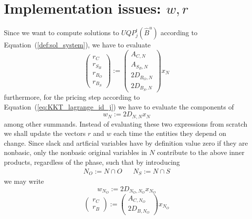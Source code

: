 \documentclass[a4paper]{article}
\begin{document}
\section{Implementation issues: $w,r$}
Since we want to compute solutions to $UQP_{j}^{t}(\hat{B}^{u})$
according to Equation~(\ref{def:sol_system}),
we have to evaluate 
\begin{equation}
\left(
\begin{array}{c}
r_{C} \\
\hline
r_{S_{B}} \\
\hline
r_{B_{O}} \\
\hline
r_{B_{S}}
\end{array}
\right)
:=
\left(
\begin{array}{c}
A_{C, N} \\
\hline
A_{S_{B}, N} \\
\hline
2D_{B_{O}, N} \\
\hline
2D_{B_{S}, N}
\end{array}
\right)
x_{N}
\end{equation}
furthermore, for the pricing step according to
Equation~(\ref{eq:KKT_lagrange_id_j}) we have to evaluate the components of
\begin{equation}
w_{N}:=2D_{N, N}x_{N}
\end{equation}
among other summands.
Instead of evaluating these two expressions from scratch we shall update
the vectors $r$ and $w$ each time the entities they depend on change.
Since slack and artficial variables have by definition
value zero if they are nonbasic,
only the nonbasic original variables in $N$ contribute to the above
inner products, regardless of the phase, such that by introducing
\begin{eqnarray}
N_{O}:=N \cap O && N_{S}:=N \cap S
\end{eqnarray} 
we may write
\begin{equation}
w_{N_{O}}:=2D_{N_{O} , N_{O}}x_{N_{O}}
\end{equation}
\begin{equation}
\left(
\begin{array}{c}
r_{C} \\
\hline
r_{B}
\end{array}
\right)
:=
\left(
\begin{array}{c}
A_{C, N_{O}} \\
\hline
2D_{B, N_{O}}
\end{array}
\right)
x_{N_{O}}
\end{equation}

\end{document}
